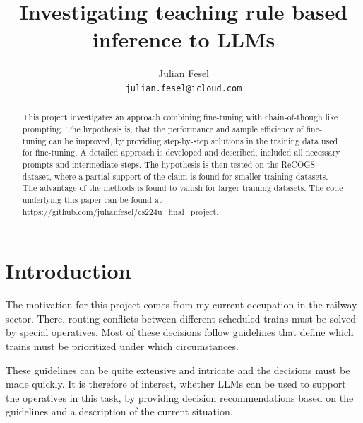 \documentclass[11pt]{article}
\title{Investigating teaching rule based inference to LLMs}
\author{Julian Fesel \\
\texttt{julian.fesel@icloud.com}
}
\begin{document}
    \maketitle
    \begin{abstract}
        This project investigates an approach combining fine-tuning with chain-of-though like prompting.
        The hypothesis is, that the performance and sample efficiency of fine-tuning can be improved, by providing
        step-by-step solutions in the training data used for fine-tuning.
        A detailed approach is developed and described, included all necessary prompts and intermediate steps.
        The hypothesis is then tested on the ReCOGS dataset, where a partial support of the claim is found for smaller
        training datasets.
        The advantage of the methods is found to vanish for larger training datasets.
        The code underlying this paper can be found at \url{https://github.com/julianfesel/cs224u_final_project}.
    \end{abstract}


    \section{Introduction}

    The motivation for this project comes from my current occupation in the railway sector.
    There, routing conflicts between different scheduled trains must be solved by special operatives.
    Most of these decisions follow guidelines that define which trains must be prioritized under which circumstances.

    These guidelines can be quite extensive and intricate and the decisions must be made quickly.
    It is therefore of interest, whether LLMs can be used to support the operatives in this task, by providing decision
    recommendations based on the guidelines and a description of the current situation.
\end{document}

